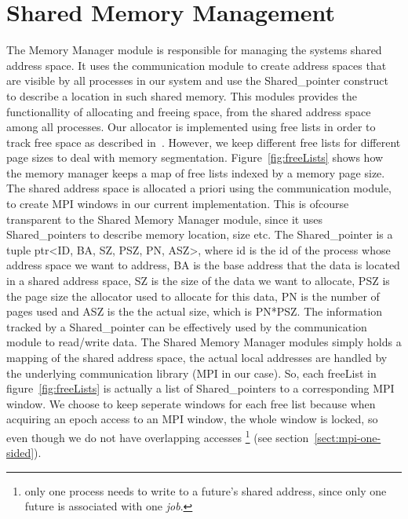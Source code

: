 \section{Shared Memory Management}
\label{sect:shared-memory-manager}
The Memory Manager module is responsible for managing the systems shared address space. 
It uses the communication module to create address spaces that
are visible by all processes in our system and use the Shared\_pointer construct to describe a location in such
shared memory.  This modules provides the functionallity of allocating and freeing space, from the shared address 
space among all processes.  Our allocator is implemented using free lists in order to track free space as 
described in~\cite[p.~185-187]{Tanenbaum:2007:MOS:1410217}.  
However, we keep different free lists for different page sizes to deal
with memory segmentation. Figure~\ref{fig:freeLists} shows how the memory manager keeps a map of free lists
indexed by a memory page size.
The shared address space is allocated a priori
using the communication module, to create MPI windows in our current implementation.  This is ofcourse transparent to
the Shared Memory Manager module, since it uses Shared\_pointers to describe memory location, size etc.  
The Shared\_pointer is a tuple  ptr<ID, BA, SZ, PSZ, PN, ASZ>, where id is the id of the process
whose address space we want to address, BA is the base address that the data is located in a shared address space,
SZ is the size of the data we want to allocate, PSZ is the page size the allocator used to allocate for this data,
PN is the number of pages used and ASZ is the the actual size, which is PN*PSZ.  The information tracked by a 
Shared\_pointer can be effectively used by the communication module to read/write data.  The Shared Memory Manager
modules simply holds a mapping of the shared address space, the actual local addresses are handled by the 
underlying communication library (MPI in our case).   
So, each freeList in figure~\ref{fig:freeLists} is actually a list of 
Shared\_pointers to a corresponding MPI window.  We choose
to keep seperate windows for each free list because when acquiring an epoch access to an MPI window, the whole 
window is locked, so even though we do not have overlapping accesses \footnote{only one process needs to write to a 
future's shared address, since only one future is associated with one \emph{job}.} 
(see section~\ref{sect:mpi-one-sided}).  

